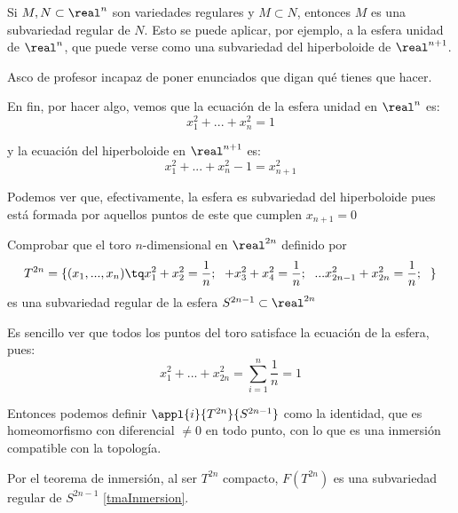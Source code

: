 \begin{problem}[3]
Si $M, N \subset \real^n$ son variedades regulares  y $M \subset N$, entonces $M$ es una subvariedad regular de $N$. Esto se puede aplicar, por ejemplo, a la esfera unidad de $\real^n$, que puede verse como una subvariedad del hiperboloide de $\real^{n+1}$.

\solution


Asco de profesor incapaz de poner enunciados que digan qué tienes que hacer.

En fin, por hacer algo, vemos que la ecuación de la esfera unidad en $\real^n$ es:
\[x_1^2 + ... + x_n^2 = 1\]

y la ecuación del hiperboloide en $\real^{n+1}$ es:
\[x_1^2+...+x_n^2-1=x_{n+1}^2\]

Podemos ver que, efectivamente, la esfera es subvariedad del hiperboloide pues está formada por aquellos puntos de este que cumplen $x_{n+1}=0$
\end{problem}

\begin{problem}[4]

Comprobar que el toro $n$-dimensional en $\real^{2n}$ definido por
\[T^{2n} = \{(x_1,...,x_n) \tq x_1^2+x_2^2 = \frac{1}{n}; \ \; + x_3^2+x_4^2 = \frac{1}{n}; \ \;...x_{2n-1}^2+x_{2n}^2 = \frac{1}{n}; \ \; \}\]
es una subvariedad regular de la esfera $S^{2n-1} \subset \real^{2n}$

\solution



Es sencillo ver que todos los puntos del toro satisface la ecuación de la esfera, pues:
\[x_1^2+...+x_{2n}^2 = \sum_{i=1}^n \frac{1}{n} = 1\]

Entonces podemos definir $\appl{i}{T^{2n}}{S^{2n-1}}$ como la identidad, que es homeomorfismo con diferencial $≠0$ en todo punto, con lo que es una inmersión compatible con la topología.

Por el teorema de inmersión, al ser $T^{2n}$ compacto, $F(T^{2n})$ es una subvariedad regular de $S^{2n-1}$ \ref{tmaInmersion}.

\end{problem}

